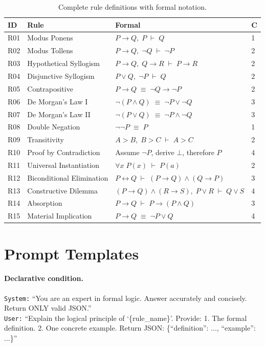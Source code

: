 \documentclass[11pt]{article}
\begin{document}
\begin{table}[h]
\centering
\small
\begin{tabular}{llll}
\toprule
\textbf{ID} & \textbf{Rule} & \textbf{Formal} & \textbf{C} \\
\midrule
R01 & Modus Ponens & $P \to Q,\; P \;\vdash\; Q$ & 1 \\
R02 & Modus Tollens & $P \to Q,\; \neg Q \;\vdash\; \neg P$ & 2 \\
R03 & Hypothetical Syllogism & $P \to Q,\; Q \to R \;\vdash\; P \to R$ & 2 \\
R04 & Disjunctive Syllogism & $P \lor Q,\; \neg P \;\vdash\; Q$ & 2 \\
R05 & Contrapositive & $P \to Q \;\equiv\; \neg Q \to \neg P$ & 2 \\
R06 & De Morgan's Law I & $\neg(P \land Q) \;\equiv\; \neg P \lor \neg Q$ & 3 \\
R07 & De Morgan's Law II & $\neg(P \lor Q) \;\equiv\; \neg P \land \neg Q$ & 3 \\
R08 & Double Negation & $\neg\neg P \;\equiv\; P$ & 1 \\
R09 & Transitivity & $A > B,\; B > C \;\vdash\; A > C$ & 2 \\
R10 & Proof by Contradiction & Assume $\neg P$, derive $\bot$, therefore $P$ & 4 \\
R11 & Universal Instantiation & $\forall x\; P(x) \;\vdash\; P(a)$ & 2 \\
R12 & Biconditional Elimination & $P \leftrightarrow Q \;\vdash\; (P \to Q) \land (Q \to P)$ & 3 \\
R13 & Constructive Dilemma & $(P \to Q) \land (R \to S),\; P \lor R \;\vdash\; Q \lor S$ & 4 \\
R14 & Absorption & $P \to Q \;\vdash\; P \to (P \land Q)$ & 3 \\
R15 & Material Implication & $P \to Q \;\equiv\; \neg P \lor Q$ & 4 \\
\bottomrule
\end{tabular}
\caption{Complete rule definitions with formal notation.}
\label{app:tab:rules}
\end{table}

\section{Prompt Templates}
\label{app:prompts}

\paragraph{Declarative condition.}
\texttt{System:} ``You are an expert in formal logic. Answer
accurately and concisely. Return ONLY valid JSON.''\\
\texttt{User:} ``Explain the logical principle of
`\{rule\_name\}'. Provide: 1. The formal definition. 2. One concrete
example. Return JSON: \{``definition'': ..., ``example'': ...\}''
\end{document}
